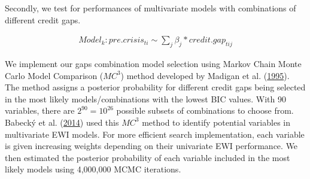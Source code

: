 \documentclass[
  12pt,
]{article}
\begin{document}
Secondly, we test for performances of multivariate models with combinations of different credit gaps.

\begin{align*}
Model_k :  pre.crisis_{ti} \sim \sum\nolimits_j \beta_j * credit.gap_{tij}
\end{align*}

We implement our gaps combination model selection using Markov Chain Monte Carlo Model Comparison (\(MC^3\)) method developed by Madigan et al. (\protect\hyperlink{ref-madigan_bayesian_1995}{1995}). The method assigns a posterior probability for different credit gaps being selected in the most likely models/combinations with the lowest BIC values. With 90 variables, there are \(2^{90} = 10^{26}\) possible subsets of combinations to choose from. Babecký et al. (\protect\hyperlink{ref-babecky_banking_2014}{2014}) used this \(MC^3\) method to identify potential variables in multivariate EWI models. For more efficient search implementation, each variable is given increasing weights depending on their univariate EWI performance. We then estimated the posterior probability of each variable included in the most likely models using 4,000,000 MCMC iterations.
\end{document}
